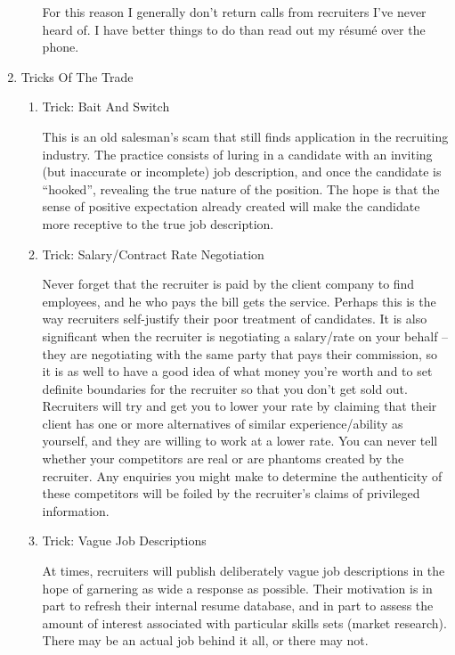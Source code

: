 \documentclass{article}
\begin{document}
\begin{enumerate}
\begin{enumerate}
For this reason I generally don't return calls from recruiters I've
never heard of. I have better things to do than read out my résumé over
the phone.
\end{enumerate}

\item Tricks Of The Trade
\label{sec:orgheadline123}

\begin{enumerate}
\item Trick: Bait And Switch
\label{sec:orgheadline117}

This is an old salesman's scam that still finds application in the
recruiting industry. The practice consists of luring in a candidate with
an inviting (but inaccurate or incomplete) job description, and once the
candidate is “hooked”, revealing the true nature of the position. The
hope is that the sense of positive expectation already created will make
the candidate more receptive to the true job description.

\item Trick: Salary/Contract Rate Negotiation
\label{sec:orgheadline118}

Never forget that the recruiter is paid by the client company to find
employees, and he who pays the bill gets the service. Perhaps this is
the way recruiters self-justify their poor treatment of candidates. It
is also significant when the recruiter is negotiating a salary/rate on
your behalf -- they are negotiating with the same party that pays their
commission, so it is as well to have a good idea of what money you're
worth and to set definite boundaries for the recruiter so that you don't
get sold out. Recruiters will try and get you to lower your rate by
claiming that their client has one or more alternatives of similar
experience/ability as yourself, and they are willing to work at a lower
rate. You can never tell whether your competitors are real or are
phantoms created by the recruiter. Any enquiries you might make to
determine the authenticity of these competitors will be foiled by the
recruiter's claims of privileged information.

\item Trick: Vague Job Descriptions
\label{sec:orgheadline119}

At times, recruiters will publish deliberately vague job descriptions in
the hope of garnering as wide a response as possible. Their motivation
is in part to refresh their internal resume database, and in part to
assess the amount of interest associated with particular skills sets
(market research). There may be an actual job behind it all, or there
may not.


\end{enumerate}
\end{enumerate}
\end{document}
